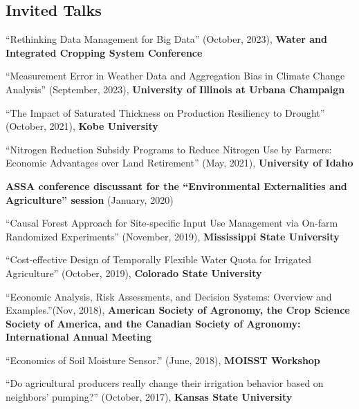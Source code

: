 \documentclass[10pt,margin,line]{res}
\newenvironment{list1}{
  \begin{list}{\ding{113}}{%
      \setlength{\itemsep}{0in}
      \setlength{\parsep}{0in} \setlength{\parskip}{0in}
      \setlength{\topsep}{0in} \setlength{\partopsep}{0in}
      \setlength{\leftmargin}{0.17in}}}{\end{list}}
\begin{document}
\begin{resume}
\section{\sc Invited Talks}
\begin{list1}
\item[] ``Rethinking Data Management for Big Data'' (October, 2023), \textbf{Water and Integrated Cropping System Conference} 
\vspace*{0.3cm}
\item[] ``Measurement Error in Weather Data and Aggregation Bias in Climate Change Analysis'' (September, 2023), \textbf{University of Illinois at Urbana Champaign} 
\vspace*{0.3cm}
\item[] ``The Impact of Saturated Thickness on Production Resiliency to Drought'' (October, 2021), \textbf{Kobe University} 
\vspace*{0.3cm}
\item[] ``Nitrogen Reduction Subsidy Programs to Reduce Nitrogen Use by Farmers: Economic Advantages over Land Retirement'' (May, 2021), \textbf{University of Idaho} 
\vspace*{0.3cm}
\item[] \textbf{ASSA conference discussant for the ``Environmental Externalities and Agriculture'' session} (January, 2020) 
\vspace*{0.3cm}
\item[] ``Causal Forest Approach for Site-specific Input Use Management via On-farm Randomized Experiments'' (November, 2019), \textbf{Mississippi State University} 
\vspace*{0.3cm}
\item[] ``Cost-effective Design of Temporally Flexible Water Quota for Irrigated Agriculture'' (October, 2019), \textbf{Colorado State University} 
\vspace*{0.3cm}
\item[] ``Economic Analysis, Risk Assessments, and Decision Systems: Overview and Examples.''(Nov, 2018), \textbf{American Society of Agronomy, the Crop Science Society of America, and the Canadian Society of Agronomy: International Annual Meeting} 
\vspace*{0.3cm}
\item[] ``Economics of Soil Moisture Sensor.'' (June, 2018), \textbf{MOISST Workshop} 
\vspace*{0.3cm}
\item[] ``Do agricultural producers really change their irrigation behavior based on neighbors' pumping?'' (October, 2017), \textbf{Kansas State University} 

\end{list1}
\end{resume}
\end{document}

